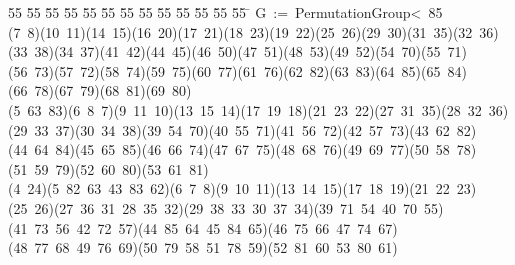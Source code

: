 %
%
\begin{tabbing}
55 \= 55 \= 55 \= 55 \= 55 \= 55 \= 55 \= 55 \= 55 \= 55 \= 55 \= 55 \= 55 \= \kill
G\ :=\ PermutationGroup{\textless}\ 85\ {\textbar}\ \\[0pt]
(7\ 8)(10\ 11)(14\ 15)(16\ 20)(17\ 21)(18\ 23)(19\ 22)(25\ 26)(29\ 30)(31\ 35)(32\ 36)(33\ 38)(34\ 37)(41\ 42)(44\ 45)(46\ 50)(47\ 51)(48\ 53)(49\ 52)(54\ 70)(55\ 71)(56\ 73)(57\ 72)(58\ 74)(59\ 75)(60\ 77)(61\ 76)(62\ 82)(63\ 83)(64\ 85)(65\ 84)(66\ 78)(67\ 79)(68\ 81)(69\ 80)\ \\[0pt]
(5\ 63\ 83)(6\ 8\ 7)(9\ 11\ 10)(13\ 15\ 14)(17\ 19\ 18)(21\ 23\ 22)(27\ 31\ 35)(28\ 32\ 36)(29\ 33\ 37)(30\ 34\ 38)(39\ 54\ 70)(40\ 55\ 71)(41\ 56\ 72)(42\ 57\ 73)(43\ 62\ 82)(44\ 64\ 84)(45\ 65\ 85)(46\ 66\ 74)(47\ 67\ 75)(48\ 68\ 76)(49\ 69\ 77)(50\ 58\ 78)(51\ 59\ 79)(52\ 60\ 80)(53\ 61\ 81)\ \\[0pt]
(4\ 24)(5\ 82\ 63\ 43\ 83\ 62)(6\ 7\ 8)(9\ 10\ 11)(13\ 14\ 15)(17\ 18\ 19)(21\ 22\ 23)(25\ 26)(27\ 36\ 31\ 28\ 35\ 32)(29\ 38\ 33\ 30\ 37\ 34)(39\ 71\ 54\ 40\ 70\ 55)(41\ 73\ 56\ 42\ 72\ 57)(44\ 85\ 64\ 45\ 84\ 65)(46\ 75\ 66\ 47\ 74\ 67)(48\ 77\ 68\ 49\ 76\ 69)(50\ 79\ 58\ 51\ 78\ 59)(52\ 81\ 60\ 53\ 80\ 61)\ \\[0pt]

\end{tabbing}
